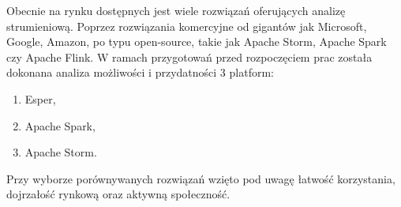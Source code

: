 Obecnie na rynku dostępnych jest wiele rozwiązań oferujących analizę strumieniową.
Poprzez rozwiązania komercyjne od gigantów jak Microsoft, Google, Amazon,
po typu open-source,
takie jak Apache Storm, Apache Spark czy Apache Flink.
W ramach przygotowań przed rozpoczęciem prac została dokonana analiza
możliwości i przydatności 3 platform:
\begin{enumerate}
	\item Esper,
	\item Apache Spark,
	\item Apache Storm.
\end{enumerate}
Przy wyborze porównywanych rozwiązań wzięto pod uwagę
łatwość korzystania,
dojrzałość rynkową
oraz aktywną społeczność.


